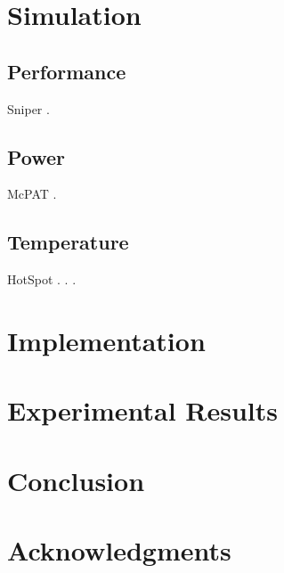 \documentclass[conference]{IEEEtran}
\begin{document}
  \section{Simulation}
  \subsection{Performance}
  Sniper \cite{carlson2011}.

  \subsection{Power}
  McPAT \cite{li2009}.

  \subsection{Temperature}
  HotSpot \cite{skadron2004}.
   \cite{sridhar2010}.
  \cite{ukhov2012}.

  \section{Implementation}
  

  \section{Experimental Results}

  \section{Conclusion}
  

  \section*{Acknowledgments}
  

  \begingroup
    
    
  \endgroup
\end{document}
